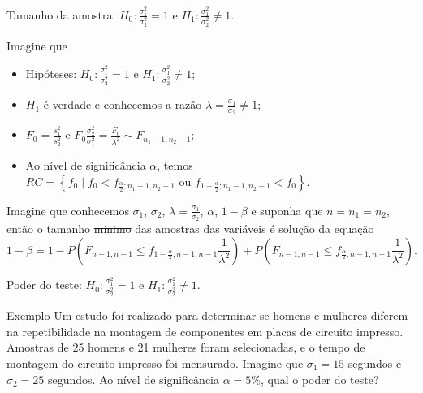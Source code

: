 \documentclass[9pt]{beamer}
\begin{document}
\begin{frame}{Tamanho da amostra: $H_0:\frac{\sigma_1^2}{\sigma_2^2} = 1$ e $H_1:\frac{\sigma_1^2}{\sigma_2^2} \neq 1$.}

Imagine que
\begin{itemize}
	\item Hipóteses: $H_0:\frac{\sigma_1^2}{\sigma_2^2} = 1$ e $H_1:\frac{\sigma_1^2}{\sigma_2^2} \neq 1$;
	\item $H_1$ é verdade e conhecemos a razão $\lambda=\frac{\sigma_1}{\sigma_2} \neq 1$;
	\item $F_0 = \frac{s_1^2}{s_2^2}$ e $F_0 \frac{\sigma_2^2}{\sigma_1^2} =  \frac{F_0}{\lambda^2} \sim F_{n_1-1, n_2-1}$;
	\item Ao nível de significância $\alpha$, temos $RC = \left\{ f_0 \mid f_0 < f_{\frac{\alpha}{2}; n_1-1, n_2-1} \mbox{ ou } f_{1-\frac{\alpha}{2}; n_1-1, n_2-1} < f_0 \right\}$.
\end{itemize}
\vfill


Imagine que conhecemos $\sigma_1$, $\sigma_2$, $\lambda = \frac{\sigma_1}{\sigma_2}$, $\alpha$, $1-\beta$ e suponha que $n=n_1=n_2$, então o tamanho \sout{mínimo} das amostras das variáveis é solução da equação
$$1-\beta=1 - P \left(F_{n-1, n-1} \leq f_{1-\frac{\alpha}{2};n-1, n-1} \frac{1}{\lambda^2} \right) + P \left(F_{n-1, n-1} \leq f_{\frac{\alpha}{2};n-1, n-1} \frac{1}{\lambda^2} \right).$$
\end{frame}

\begin{frame}{Poder do teste: $H_0:\frac{\sigma_1^2}{\sigma_2^2} = 1$ e $H_1:\frac{\sigma_1^2}{\sigma_2^2} \neq 1$.}

\large

\begin{block}{Exemplo}
	Um estudo foi realizado para determinar se homens e mulheres diferem na repetibilidade na montagem de componentes em placas de circuito impresso. Amostras de 25 homens e 21 mulheres foram selecionadas, e o tempo de montagem do circuito impresso foi mensurado. 
	Imagine que $\sigma_1=15$ segundos e $\sigma_2=25$ segundos. Ao nível de significância $\alpha=5\%$, qual o poder do teste?
\end{block}

\normalsize
\end{frame}
\end{document}
